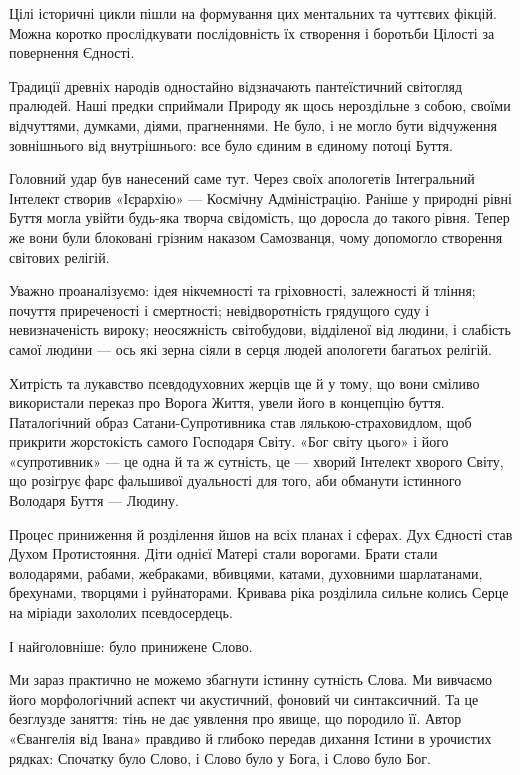 Цілі історичні цикли пішли на формування цих ментальних та чуттєвих фікцій.
Можна коротко прослідкувати послідовність їх створення і боротьби Цілості за
повернення Єдності.

Традиції древніх народів одностайно відзначають пантеїстичний світогляд
пралюдей. Наші предки сприймали Природу як щось нероздільне з собою, своїми
відчуттями, думками, діями, прагненнями. Не було, і не могло бути відчуження
зовнішнього від внутрішнього: все було єдиним в єдиному потоці Буття.

Головний удар був нанесений саме тут. Через своїх апологетів Інтегральний
Інтелект створив «Ієрархію» — Космічну Адміністрацію. Раніше у природні рівні
Буття могла увійти будь-яка творча свідомість, що доросла до такого рівня.
Тепер же вони були блоковані грізним наказом Самозванця, чому допомогло
створення світових релігій.

Уважно проаналізуємо: ідея нікчемності та гріховності, залежності й тління;
почуття приреченості і смертності; невідворотність грядущого суду і
невизначеність вироку; неосяжність світобудови, відділеної від людини, і
слабість самої людини — ось які зерна сіяли в серця людей апологети багатьох
релігій.

Хитрість та лукавство псевдодуховних жерців ще й у тому, що вони сміливо
використали переказ про Ворога Життя, увели його в концепцію буття.
Паталогічний образ Сатани-Супротивника став лялькою-страховидлом, щоб прикрити
жорстокість самого Господаря Світу. «Бог світу цього» і його «супротивник» — це
одна й та ж сутність, це — хворий Інтелект хворого Світу, що розігрує фарс
фальшивої дуальності для того, аби обманути істинного Володаря Буття — Людину.


Процес приниження й розділення йшов на всіх планах і сферах. Дух Єдності став
Духом Протистояння. Діти однієї Матері стали ворогами. Брати стали володарями,
рабами, жебраками, вбивцями, катами, духовними шарлатанами, брехунами, творцями
і руйнаторами. Кривава ріка розділила сильне колись Серце на міріади захололих
псевдосердець.

І найголовніше: було принижене Слово.

Ми зараз практично не можемо збагнути істинну сутність Слова. Ми вивчаємо його
морфологічний аспект чи акустичний, фоновий чи синтаксичний. Та це безглузде
заняття: тінь не дає уявлення про явище, що породило її. Автор «Євангелія від
Івана» правдиво й глибоко передав дихання Істини в урочистих рядках: Спочатку
було Слово, і Слово було у Бога, і Слово було Бог.

